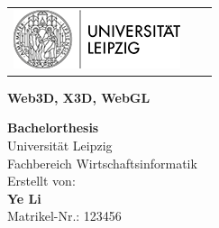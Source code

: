 
\newcommand{\trtitleone}{Web3D, X3D, WebGL}
\newcommand{\trtitletwo}{} 
\newcommand{\trtype}{Bachelorthesis}
\newcommand{\trauthor}{Ye Li}
\newcommand{\trstrasse}{Brauhausstraße11}
\newcommand{\trmatrikelnummer}{123456}
\newcommand{\trort}{04109 Leipzig}
\newcommand{\trfachbereich}{Wirtschaftsinformatik}
\newcommand{\truni}{Universität Leipzig}
\newcommand{\trdate}{\today}

\thispagestyle{plain}

\begin{tabular}{lcr}
  \hspace{4.3cm}
  \includegraphics[scale=1]{bilder/logo.png}\\
\end{tabular}

\hrulefill

\vspace{2cm}
\begin{center}
  \textbf{\LARGE \trtitleone}\\[0.1cm]
\end{center}
\vspace{4cm}

\begin{center}
  \textbf{\trtype} \\
  \truni\\
  Fachbereich \trfachbereich \\[2.5cm]
  Erstellt von:\\
  \textbf{\trauthor}\\
  Matrikel-Nr.: \trmatrikelnummer
\end{center}

\vfill
\hrulefill
